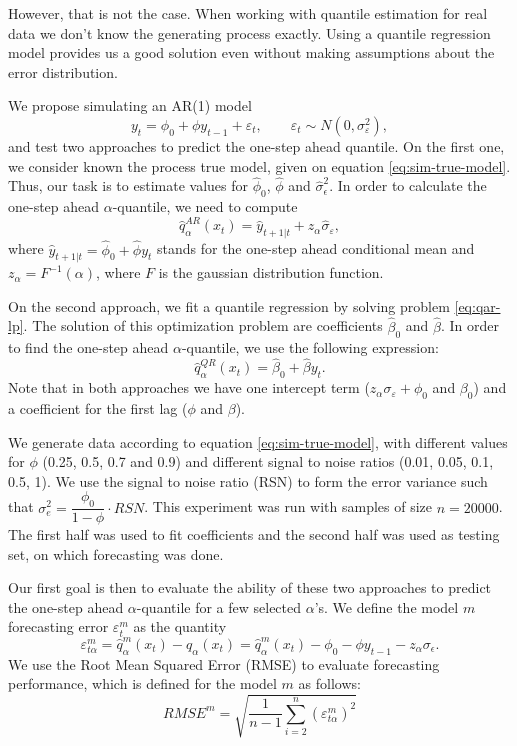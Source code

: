 However, that is not the case. When working with quantile estimation for real data we don't know the generating process exactly. Using a quantile regression model provides us a good solution even without making assumptions about the error distribution. 

We propose simulating an AR(1) model
\begin{equation}
y_t = \phi_0 +  \phi y_{t-1} + \varepsilon_t,\qquad \varepsilon_t \sim N(0, \sigma_\varepsilon^2),	
\label{eq:sim-true-model}
\end{equation}
and test two approaches to predict the one-step ahead quantile. On the first one, we consider known the process true model, given on equation \ref{eq:sim-true-model}. Thus, our task is to estimate values for $\hat{\phi}_0$, $\hat{\phi}$ and $\hat{\sigma}_\epsilon^2$. In order to calculate the one-step ahead $\alpha$-quantile, we need to compute
\begin{equation}
\hat{q}^{AR}_\alpha(x_t) = \hat{y}_{t+1|t} + z_\alpha \hat{\sigma}_\varepsilon,
\end{equation}
where $\hat{y}_{t+1|t} = \hat{\phi}_0 + \hat{\phi} y_{t}$ stands for the one-step ahead conditional mean and $z_\alpha = F^{-1}(\alpha)$, where $F$ is the gaussian distribution function.

On the second approach, we fit a quantile regression by solving problem \ref{eq:qar-lp}. The solution of this optimization problem are coefficients $\hat{\beta}_0$ and $\hat{\beta}$. In order to find the one-step ahead $\alpha$-quantile, we use the following expression:
\begin{equation}
\hat{q}^{QR}_\alpha(x_t) = \hat{\beta}_0 + \hat{\beta} y_{t}.
\end{equation}
Note that in both approaches we have one intercept term ($z_\alpha \sigma_\varepsilon + {\phi}_0$ and $\beta_0$) and a coefficient for the first lag ($\phi$ and $\beta$). 

We generate data according to equation \ref{eq:sim-true-model}, with different values for $\phi$ (0.25, 0.5, 0.7 and 0.9) and different signal to noise ratios (0.01, 0.05, 0.1, 0.5, 1). We use the signal to noise ratio (RSN) to form the error variance such that $\sigma_e^2 = \dfrac{\phi_0}{1-\phi} \cdot RSN$. This experiment was run with samples of size $n=20000$. The first half was used to fit coefficients and the second half was used as testing set, on which forecasting was done.

Our first goal is then to evaluate the ability of these two approaches to predict the one-step ahead $\alpha$-quantile for a few selected $\alpha$'s. We define the model $m$ forecasting error $\varepsilon_t^m$ as the quantity 
\begin{equation}
\varepsilon_{t \alpha}^m = \hat{q}^{m}_\alpha(x_t) - q_\alpha(x_t) = \hat{q}^{m}_\alpha(x_t) - \phi_0 - \phi y_{t-1} - z_\alpha \sigma_\epsilon.
\end{equation}
We use the Root Mean Squared Error (RMSE) to evaluate forecasting performance, which is defined for the model $m$ as follows:
\begin{equation}
RMSE^m = \sqrt{ \frac{1}{n-1} \sum_{i=2}^{n} \left( \varepsilon_{t \alpha}^m \right)^2}
\end{equation}

